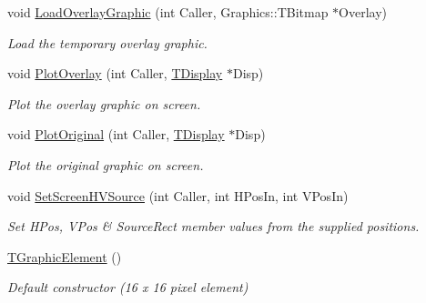\begin{DoxyCompactItemize}
\mbox{\label{class_t_graphic_element_a82c786873b196ec443f052dedac8b1c1}} 
void \mbox{\hyperlink{class_t_graphic_element_a82c786873b196ec443f052dedac8b1c1}{Load\+Overlay\+Graphic}} (int Caller, Graphics\+::\+T\+Bitmap $\ast$Overlay)
\begin{DoxyCompactList}\small\item\em Load the temporary overlay graphic. \end{DoxyCompactList}\item 
\mbox{\label{class_t_graphic_element_a04ccc26451ff7d95dc3c5951b71f421e}} 
void \mbox{\hyperlink{class_t_graphic_element_a04ccc26451ff7d95dc3c5951b71f421e}{Plot\+Overlay}} (int Caller, \mbox{\hyperlink{class_t_display}{T\+Display}} $\ast$Disp)
\begin{DoxyCompactList}\small\item\em Plot the overlay graphic on screen. \end{DoxyCompactList}\item 
\mbox{\label{class_t_graphic_element_ad9e23ba031b1110126227d301b59ffc7}} 
void \mbox{\hyperlink{class_t_graphic_element_ad9e23ba031b1110126227d301b59ffc7}{Plot\+Original}} (int Caller, \mbox{\hyperlink{class_t_display}{T\+Display}} $\ast$Disp)
\begin{DoxyCompactList}\small\item\em Plot the original graphic on screen. \end{DoxyCompactList}\item 
\mbox{\label{class_t_graphic_element_afbfce56e5041fa0ac49b3ba49f7566fd}} 
void \mbox{\hyperlink{class_t_graphic_element_afbfce56e5041fa0ac49b3ba49f7566fd}{Set\+Screen\+H\+V\+Source}} (int Caller, int H\+Pos\+In, int V\+Pos\+In)
\begin{DoxyCompactList}\small\item\em Set H\+Pos, V\+Pos \& Source\+Rect member values from the supplied positions. \end{DoxyCompactList}\item 
\mbox{\label{class_t_graphic_element_a037be3b14fb32ebac36bbee7b76a6fc1}} 
\mbox{\hyperlink{class_t_graphic_element_a037be3b14fb32ebac36bbee7b76a6fc1}{T\+Graphic\+Element}} ()
\begin{DoxyCompactList}\small\item\em Default constructor (16 x 16 pixel element) \end{DoxyCompactList}\item 

\end{DoxyCompactItemize}
